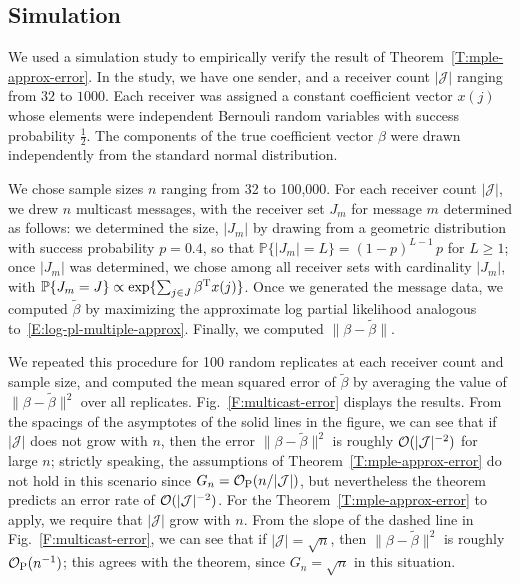 \documentclass[final]{statsoc}
\begin{document}
\subsection{Simulation}

We used a simulation study to empirically verify the result of
Theorem~\ref{T:mple-approx-error}.  In the study, we have one sender,
and a receiver count $|\mathcal{J}|$ ranging from $32$ to $1000$.  Each
receiver was assigned a constant coefficient vector $x(j)$ whose elements were
independent Bernouli random variables with success probability $\tfrac{1}{2}$.
The components of the true coefficient vector $\beta$ were drawn independently
from the standard normal distribution.

We chose sample sizes $n$ ranging from 32 to 100,000.  For each receiver count
$|\mathcal{J}|$, we drew $n$ multicast messages, with the receiver set $J_m$ for
message $m$ determined as follows:
we determined the size, $|J_m|$ by drawing from a geometric distribution
with success probability $p = 0.4$, so that $\mathbb{P}\{|J_m| = L\} = (1 - p)^{L -
1} \, p$ for $L \geq 1$; once $|J_m|$ was determined, we chose among
all receiver sets with cardinality $|J_m|$, with
$\mathbb{P}\{ J_m = J \} \propto \exp\{ \sum_{j \in J} \beta^{\mathrm{T}} x(j)\}$.
Once we generated the message data, we computed $\tilde \beta$ by maximizing
the approximate log partial likelihood analogous
to~\eqref{E:log-pl-multiple-approx}.  Finally, we computed $\|\beta - \tilde
\beta\|$.

We repeated this procedure for 100 random replicates at each receiver count
and sample size, and computed the mean squared error of $\tilde \beta$ by
averaging the value of $\|\beta - \tilde \beta\|^2$ over all replicates.
Fig.~\ref{F:multicast-error} displays the results.  From the spacings of the
asymptotes of the solid lines in the figure, we can see that if
$|\mathcal{J}|$ does not grow with $n$, then the error $\|\beta - \tilde
\beta\|^2$ is roughly $\mathcal{O}(|\mathcal{J}|^{-2})$ for large $n$; strictly
speaking, the assumptions of Theorem~\ref{T:mple-approx-error} do not hold in
this scenario since $G_n = \mathcal{O}_\text{P}(n / |\mathcal{J}|)$, but nevertheless the
theorem predicts an error rate of $\mathcal{O}(|\mathcal{J}|^{-2})$.  For the
Theorem~\ref{T:mple-approx-error} to apply, we require that $|\mathcal{J}|$
grow with $n$.  From the slope of the dashed line in
Fig.~\ref{F:multicast-error}, we can see that if $|\mathcal{J}| = \sqrt{n}$,
then $\|\beta - \tilde \beta\|^2$ is roughly $\mathcal{O}_\text{P}(n^{-1})$; this agrees with
the theorem, since $G_n = \sqrt{n}$ in this situation.
\end{document}
